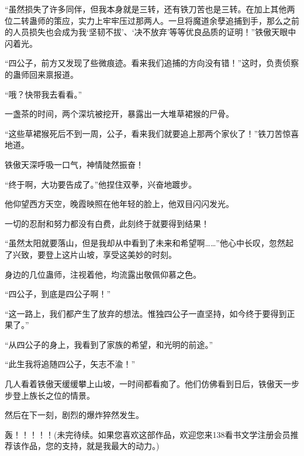 \begin{this_body}
“虽然损失了许多同伴，但我本身就是三转，还有铁刀苦也是三转。在加上其他两位二转蛊师的策应，实力上牢牢压过那两人。一旦将魔道余孽追捕到手，那么之前的人员损失也会成为我‘坚韧不拔’、‘决不放弃’等等优良品质的证明！”铁傲天眼中闪着光。

“四公子，前方又发现了些微痕迹。看来我们追捕的方向没有错！”这时，负责侦察的蛊师回来禀报道。

“哦？快带我去看看。”

一盏茶的时间，两个深坑被挖开，暴露出一大堆草裙猴的尸骨。

“这些草裙猴死后不到一周，公子，看来我们就要追上那两个家伙了！”铁刀苦惊喜地道。

铁傲天深呼吸一口气，神情陡然振奋！

“终于啊，大功要告成了。”他捏住双拳，兴奋地踱步。

他仰望西方天空，晚霞映照在他年轻的脸上，他双目闪闪发光。

一切的忍耐和努力都没有白费，此刻终于就要得到结果！

“虽然太阳就要落山，但是我却从中看到了未来和希望啊……”他心中长叹，忽然起了兴致，要登上这片山坡，享受这美妙的时刻。

身边的几位蛊师，注视着他，均流露出敬佩仰慕之色。

“四公子，到底是四公子啊！”

“这一路上，我们都产生了放弃的想法。惟独四公子一直坚持，如今终于要得到正果了。”

“从四公子的身上，我看到了家族的希望，和光明的前途。”

“此生我将追随四公子，矢志不渝！”

几人看着铁傲天缓缓攀上山坡，一时间都看痴了。他们仿佛看到日后，铁傲天一步步登上族长之位的情景。

然后在下一刻，剧烈的爆炸猝然发生。

轰！！！！！(未完待续。如果您喜欢这部作品，欢迎您来138看书文学注册会员推荐该作品，您的支持，就是我最大的动力。)

\end{this_body}

